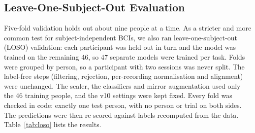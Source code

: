 \documentclass[pdflatex,sn-mathphys-num]{sn-jnl}%
\theoremstyle{thmstyleone}%
\theoremstyle{thmstyletwo}%
\theoremstyle{thmstylethree}%
\begin{document}
\subsection{Leave-One-Subject-Out Evaluation}\label{subsec:loso}

Five-fold validation holds out about nine people at a time. As a stricter and more common test for subject-independent BCIs, we also ran leave-one-subject-out (LOSO) validation: each participant was held out in turn and the model was trained on the remaining 46, so 47 separate models were trained per task. Folds were grouped by person, so a participant with two sessions was never split. The label-free steps (filtering, rejection, per-recording normalisation and alignment) were unchanged. The scaler, the classifiers and mirror augmentation used only the 46 training people, and the v10 settings were kept fixed. Every fold was checked in code: exactly one test person, with no person or trial on both sides. The predictions were then re-scored against labels recomputed from the data. Table~\ref{tab:loso} lists the results.

\begin{table}[htbp]
\centering
\caption{Leave-one-subject-out results (trial level, pooled over 47 folds; correct trials in brackets). The last row repeats the ensemble under person-wise 5-fold (3-fold for six and twelve classes) for comparison.}
\label{tab:loso}
\end{table}
\end{document}
